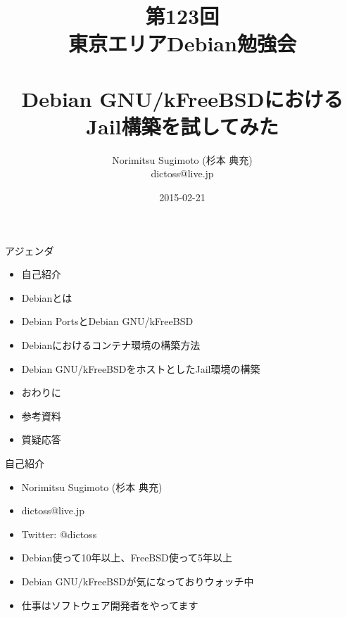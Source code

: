 \title{第123回 \\東京エリアDebian勉強会 \\　\\Debian GNU/kFreeBSDにおけるJail構築を試してみた}
\subtitle{}
\author{Norimitsu Sugimoto (杉本 典充) \\dictoss@live.jp}
\date{2015-02-21}



\frame{\titlepage{}}


\begin{frame}{アジェンダ}
 \begin{itemize}
  \item 自己紹介
  \item Debianとは
  \item Debian PortsとDebian GNU/kFreeBSD
  \item Debianにおけるコンテナ環境の構築方法
  \item Debian GNU/kFreeBSDをホストとしたJail環境の構築
  \item おわりに
  \item 参考資料
  \item 質疑応答
 \end{itemize}
\end{frame}

\begin{frame}{自己紹介}
 \begin{itemize}
  \item Norimitsu Sugimoto (杉本 典充)
  \item dictoss@live.jp
  \item Twitter: @dictoss
  \item Debian使って10年以上、FreeBSD使って5年以上
  \item Debian GNU/kFreeBSDが気になっておりウォッチ中
  \item 仕事はソフトウェア開発者をやってます
 \end{itemize}
\end{frame}

